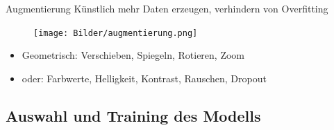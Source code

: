 \begin{frame}{Augmentierung}
    Künstlich mehr Daten erzeugen, verhindern von Overfitting
        \begin{figure}
            \centering
            \texttt{[image: Bilder/augmentierung.png]}            
        \end{figure}
        \begin{itemize}
            \item Geometrisch: Verschieben, Spiegeln, Rotieren, Zoom
            \item oder: Farbwerte, Helligkeit, Kontrast, Rauschen, Dropout
        \end{itemize}

\end{frame}

\subsection[\thesection .\thesubsection \ 
Auswahl und Training des Modells]{Auswahl und Training des Modells}\label{subsec:train}


